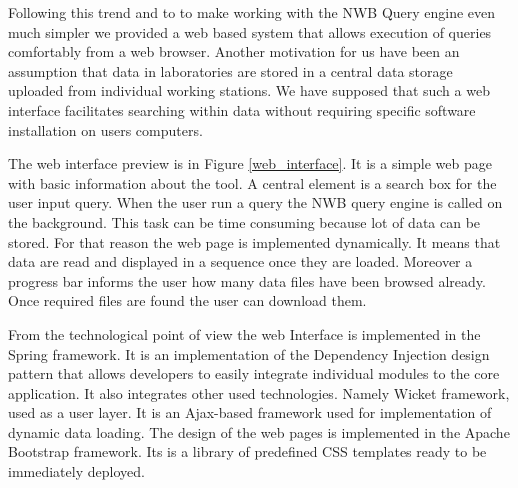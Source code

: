 \documentclass[utf8]{frontiersSCNS} %
\begin{document}
Following this trend and to to make working with the NWB Query engine even much simpler we provided a web based system that allows execution of queries comfortably from a web browser. Another motivation for us have been an assumption that data in laboratories are stored in a central data storage uploaded from individual working stations. We have supposed that such a web interface facilitates searching within data without requiring specific software installation on users computers.

The web interface preview is in Figure \ref{web_interface}. It is a simple web page with basic information about the tool. A central element is a search box for the user input query. When the user run a query the NWB query engine is called on the background. This task can be time consuming because lot of data can be stored. For that reason the web page is implemented dynamically. It means that data are read and displayed in a sequence once they are loaded. Moreover a progress bar informs the user how many data files have been browsed already. Once required files are found the user can download them.

From the technological point of view the web Interface is implemented in the Spring framework. It is an implementation of the Dependency Injection design pattern that allows developers to easily integrate individual modules to the core application. It also integrates other used technologies. Namely Wicket framework, used as a user layer. It is an Ajax-based framework used for implementation of dynamic data loading. The design of the web pages is implemented in the Apache Bootstrap framework. Its is a library of predefined CSS templates ready to be immediately deployed.
\end{document}

